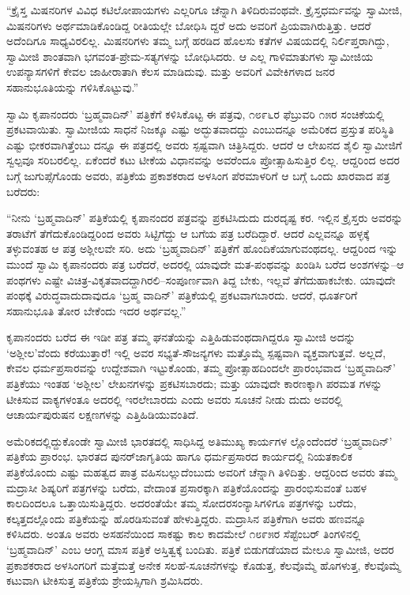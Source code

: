“ಕ್ರೈಸ್ತ ಮಿಷನರಿಗಳ ವಿವಿಧ ಕಟಿಲೋಪಾಯಗಳು ಎಲ್ಲರಿಗೂ ಚೆನ್ನಾಗಿ ತಿಳಿದಿರುವಂಥವೇ. ಕ್ರೈಸ್ತಧರ್ಮವನ್ನು ಸ್ವಾಮೀಜಿ, ಮಿಷನರಿಗಳು ಅರ್ಥಮಾಡಿಕೊಂಡಿದ್ದ ರೀತಿಯಲ್ಲೇ ಬೋಧಿಸಿ ದ್ದರೆ ಅದು ಅವರಿಗೆ ಪ್ರಿಯವಾಗಿರುತ್ತಿತ್ತು. ಆದರೆ ಅದೆಂದಿಗೂ ಸಾಧ್ಯವಿರಲಿಲ್ಲ. ಮಿಷನರಿಗಳು ತಮ್ಮ ಬಗ್ಗೆ ಹರಡಿದ ಹೊಲಸು ಕತೆಗಳ ವಿಷಯದಲ್ಲಿ ನಿರ್ಲಿಪ್ತರಾಗಿದ್ದು, ಸ್ವಾಮೀಜಿ ಶಾಂತವಾಗಿ ಭಗವಂತ-ಪ್ರೇಮ-ಸತ್ಯಗಳನ್ನು ಬೋಧಿಸಿದರು. ಆ ಎಲ್ಲ ಗಾಳಿಮಾತುಗಳು ಸ್ವಾಮೀಜಿಯ ಉಪನ್ಯಾಸಗಳಿಗೆ ಕೇವಲ ಜಾಹೀರಾತಾಗಿ ಕೆಲಸ ಮಾಡಿದುವು. ಮತ್ತು ಅವರಿಗೆ ವಿವೇಕಿಗಳಾದ ಜನರ ಸಹಾನುಭೂತಿಯನ್ನು ಗಳಿಸಿಕೊಟ್ಟುವು.”

ಸ್ವಾಮಿ ಕೃಪಾನಂದರು ‘ಬ್ರಹ್ಮವಾದಿನ್​’ ಪತ್ರಿಕೆಗೆ ಕಳಿಸಿಕೊಟ್ಟ ಈ ಪತ್ರವು, ೧೮೯೬ರ ಫೆಬ್ರುವರಿ ೧೫ರ ಸಂಚಿಕೆಯಲ್ಲಿ ಪ್ರಕಟವಾಯಿತು. ಸ್ವಾಮೀಜಿಯ ಸಾಧನೆ ನಿಜಕ್ಕೂ ಎಷ್ಟು ಅದ್ಭುತವಾದದ್ದು ಎಂಬುದನ್ನೂ ಅಮೆರಿಕದ ಪ್ರಸ್ತುತ ಪರಿಸ್ಥಿತಿ ಎಷ್ಟು ಭೀಕರವಾಗಿತ್ತೆಂಬು ದನ್ನೂ ಈ ಪತ್ರದಲ್ಲಿ ಅವರು ಸ್ಪಷ್ಟವಾಗಿ ಚಿತ್ರಿಸಿದ್ದರು. ಆದರೆ ಆ ಲೇಖನದ ಶೈಲಿ ಸ್ವಾಮೀಜಿಗೆ ಸ್ವಲ್ಪವೂ ಸರಿಬರಲಿಲ್ಲ. ಏಕೆಂದರೆ ಕಟು ಟೀಕೆಯ ವಿಧಾನವನ್ನು ಅವರೆಂದೂ ಪ್ರೋತ್ಸಾಹಿಸುತ್ತಿರ ಲಿಲ್ಲ. ಆದ್ದರಿಂದ ಅದರ ಬಗ್ಗೆ ಜುಗುಪ್ಸೆಗೊಂಡು ಅವರು, ಪತ್ರಿಕೆಯ ಪ್ರಕಾಶಕರಾದ ಅಳಸಿಂಗ ಪೆರಮಾಳರಿಗೆ ಆ ಬಗ್ಗೆ ಒಂದು ಖಾರವಾದ ಪತ್ರ ಬರೆದರು:

“ನೀನು ‘ಬ್ರಹ್ಮವಾದಿನ್​’ ಪತ್ರಿಕೆಯಲ್ಲಿ ಕೃಪಾನಂದರ ಪತ್ರವನ್ನು ಪ್ರಕಟಿಸಿದುದು ದುರದೃಷ್ಟ ಕರ. ಇಲ್ಲಿನ ಕ್ರೈಸ್ತರು ಅವರನ್ನು ತರಾಟೆಗೆ ತೆಗೆದುಕೊಂಡಿದ್ದರಿಂದ ಅವರು ಸಿಟ್ಟಿಗೆದ್ದು ಆ ಬಗೆಯ ಪತ್ರ ಬರೆದಿದ್ದಾರೆ. ಆದರೆ ಎಲ್ಲವನ್ನೂ ಹಳ್ಳಕ್ಕೆ ತಳ್ಳುವಂತಹ ಆ ಪತ್ರ ಅಶ್ಲೀಲವೇ ಸರಿ. ಅದು ‘ಬ್ರಹ್ಮವಾದಿನ್​’ ಪತ್ರಿಕೆಗೆ ಹೊಂದಿಕೆಯಾಗುವಂಥದಲ್ಲ. ಆದ್ದರಿಂದ ಇನ್ನು ಮುಂದೆ ಸ್ವಾಮಿ ಕೃಪಾನಂದರು ಪತ್ರ ಬರೆದರೆ, ಅದರಲ್ಲಿ ಯಾವುದೇ ಮತ-ಪಂಥವನ್ನು ಖಂಡಿಸಿ ಬರೆದ ಅಂಶಗಳನ್ನು–ಆ ಪಂಥಗಳು ಎಷ್ಟೇ ವಿಚಿತ್ರ-ವಿಕೃತವಾದದ್ದಾಗಿರಲಿ–ಸಂಪೂರ್ಣವಾಗಿ ತಿದ್ದ ಬೇಕು, ಇಲ್ಲವೆ ತೆಗೆದುಹಾಕಬೇಕು. ಯಾವುದೇ ಪಂಥಕ್ಕೆ ವಿರುದ್ಧವಾದುದಾವುದೂ ‘ಬ್ರಹ್ಮ ವಾದಿನ್​’ ಪತ್ರಿಕೆಯಲ್ಲಿ ಪ್ರಕಟವಾಗಬಾರದು. ಆದರೆ, ಧೂರ್ತರಿಗೆ ಸಹಾನುಭೂತಿ ತೋರ ಬೇಕೆಂದು ಇದರ ಅರ್ಥವಲ್ಲ.”

ಕೃಪಾನಂದರು ಬರೆದ ಈ ಇಡೀ ಪತ್ರ ತಮ್ಮ ಘನತೆಯನ್ನು ಎತ್ತಿಹಿಡುವಂಥದಾಗಿದ್ದರೂ ಸ್ವಾಮೀಜಿ ಅದನ್ನು ‘ಅಶ್ಲೀಲ’ವೆಂದು ಕರೆಯುತ್ತಾರೆ! ಇಲ್ಲಿ ಅವರ ಸಭ್ಯತೆ-ಸೌಜನ್ಯಗಳು ಮತ್ತೊಮ್ಮೆ ಸ್ಪಷ್ಟವಾಗಿ ವ್ಯಕ್ತವಾಗುತ್ತವೆ. ಅಲ್ಲದೆ, ಕೇವಲ ಧರ್ಮಪ್ರಸಾರವನ್ನು ಉದ್ದೇಶವಾಗಿ ಇಟ್ಟುಕೊಂಡು, ತಮ್ಮ ಪ್ರೋತ್ಸಾಹದಿಂದಲೇ ಪ್ರಾರಂಭವಾದ ‘ಬ್ರಹ್ಮವಾದಿನ್​’ ಪತ್ರಿಕೆಯು ಇಂತಹ ‘ಅಶ್ಲೀಲ’ ಲೇಖನಗಳನ್ನು ಪ್ರಕಟಿಸಬಾರದು; ಮತ್ತು ಯಾವುದೇ ಕಾರಣಕ್ಕಾಗಿ ಪರಮತ ಗಳನ್ನು ಟೀಕಿಸುವ ವಾಕ್ಯಗಳಂತೂ ಅದರಲ್ಲಿ ಇರಲೇಬಾರದು ಎಂದು ಅವರು ಸೂಚನೆ ನೀಡು ದುದು ಅವರಲ್ಲಿ ಆಚಾರ್ಯಪುರುಷನ ಲಕ್ಷಣಗಳನ್ನು ಎತ್ತಿಹಿಡಿಯುವಂತಿದೆ.

ಅಮೆರಿಕದಲ್ಲಿದ್ದುಕೊಂಡೇ ಸ್ವಾಮೀಜಿ ಭಾರತದಲ್ಲಿ ಸಾಧಿಸಿದ್ದ ಅತಿಮುಖ್ಯ ಕಾರ್ಯಗಳ ಲ್ಲೊಂದೆಂದರೆ ‘ಬ್ರಹ್ಮವಾದಿನ್​’ ಪತ್ರಿಕೆಯ ಪ್ರಾರಂಭ. ಭಾರತದ ಪುನರ್​ಜಾಗೃತಿಯ ಹಾಗೂ ಧರ್ಮಪ್ರಸಾರದ ಕಾರ್ಯದಲ್ಲಿ ನಿಯತಕಾಲಿಕ ಪತ್ರಿಕೆಯೊಂದು ಎಷ್ಟು ಮಹತ್ವದ ಪಾತ್ರ ವಹಿಸಬಲ್ಲುದೆಂಬುದು ಅವರಿಗೆ ಚೆನ್ನಾಗಿ ತಿಳಿದಿತ್ತು. ಆದ್ದರಿಂದ ಅವರು ತಮ್ಮ ಮದ್ರಾಸೀ ಶಿಷ್ಯರಿಗೆ ಪತ್ರಗಳನ್ನು ಬರೆದು, ವೇದಾಂತ ಪ್ರಸಾರಕ್ಕಾಗಿ ಪತ್ರಿಕೆಯೊಂದನ್ನು ಪ್ರಾರಂಭಿಸುವಂತೆ ಬಹಳ ಕಾಲದಿಂದಲೂ ಒತ್ತಾಯಿಸುತ್ತಿದ್ದರು. ಅದರಂತೆಯೇ ತಮ್ಮ ಸೋದರಸಂನ್ಯಾಸಿಗಳಿಗೂ ಪತ್ರಗಳನ್ನು ಬರೆದು, ಕಲ್ಕತ್ತದಲ್ಲೊಂದು ಪತ್ರಿಕೆಯನ್ನು ಹೊರಡಿಸುವಂತೆ ಹೇಳುತ್ತಿದ್ದರು. ಮದ್ರಾಸಿನ ಪತ್ರಿಕೆಗಾಗಿ ಅವರು ಹಣವನ್ನೂ ಕಳಿಸಿದರು. ಅಂತೂ ಅವರು ಅಸಹನೆಯಿಂದ ಸಾಕಷ್ಟು ಕಾಲ ಕಾದಮೇಲೆ ೧೮೯೫ರ ಸೆಪ್ಟೆಂಬರ್ ತಿಂಗಳಿನಲ್ಲಿ ‘ಬ್ರಹ್ಮವಾದಿನ್​’ ಎಂಬ ಆಂಗ್ಲ ಮಾಸ ಪತ್ರಿಕೆ ಅಸ್ತಿತ್ವಕ್ಕೆ ಬಂದಿತು. ಪತ್ರಿಕೆ ಬಿಡುಗಡೆಯಾದ ಮೇಲೂ ಸ್ವಾಮೀಜಿ, ಅದರ ಪ್ರಕಾಶಕರಾದ ಅಳಸಿಂಗರಿಗೆ ಮತ್ತೆಮತ್ತೆ ಅನೇಕ ಸಲಹೆ-ಸೂಚನೆಗಳನ್ನು ಕೊಡುತ್ತ, ಕೆಲವೊಮ್ಮೆ ಹೊಗಳುತ್ತ, ಕೆಲವೊಮ್ಮೆ ಕಟುವಾಗಿ ಟೀಕಿಸುತ್ತ ಪತ್ರಿಕೆಯ ಶ್ರೇಯಸ್ಸಿಗಾಗಿ ಶ್ರಮಿಸಿದರು.

